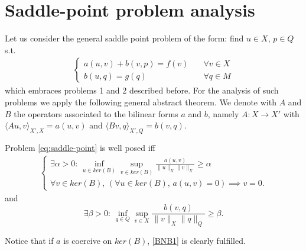 \section{Saddle-point problem analysis}
Let us consider the general saddle point problem of the form: find $u\in X$, $p\in Q$ s.t.
\begin{eqnarray}\label{eq:saddle-point}
\begin{cases}
a(u,v)+b(v,p)=f(v)\quad &\forall v\in X\\
b(u,q)=g(q) \quad &\forall q\in M
\end{cases}
\end{eqnarray}
which embraces problems 1 and 2 described before.
For the analysis of such problems we apply the following general abstract theorem.
We denote with $A$ and $B$ the operators associated to the bilinear forms $a$ and $b$, 
namely $A: X \longrightarrow X'$ with $\langle Au,v\rangle _{X',X} = a(u,v)$ and $\langle Bv,q\rangle_{X',Q} = b(v,q)$.
\begin{theorem}\label{th:bnb}
Problem \eqref{eq:saddle-point} is well posed iff 
\begin{eqnarray}\label{BNB1}
\begin{cases}
\exists \alpha >0 :\, \inf_{u\in ker(B)}\sup_{v\in ker(B)} \frac{a(u,v)}{\|u\|_{X}\|v\|_{X}}\geq \alpha\\
\forall v \in ker(B), \, \left( \forall u \in ker(B),\, a(u,v)=0 \right)\implies v=0.
\end{cases}
\end{eqnarray}
and 
\begin{equation}\label{eq:infsup}
\exists \beta >0:\,\inf_{q\in Q}\sup_{v\in X} \frac{b(v,q)}{\|v\|_{X}\|q\|_{Q}}\geq \beta .
\end{equation}
\end{theorem} 
Notice that if $a$ is coercive on $ker(B)$, \eqref{BNB1} is clearly fulfilled. 

